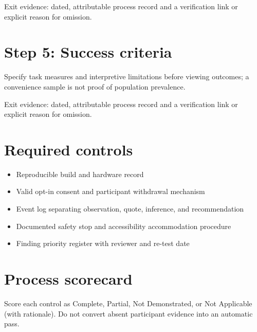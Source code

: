 \documentclass[11pt]{article}
\begin{document}
Exit evidence: dated, attributable process record and a verification link or explicit reason for omission.


\section{Step 5: Success criteria}
Specify task measures and interpretive limitations before viewing outcomes; a convenience sample is not proof of population prevalence.

Exit evidence: dated, attributable process record and a verification link or explicit reason for omission.


\section{Required controls}
\begin{itemize}
\item Reproducible build and hardware record
\item Valid opt-in consent and participant withdrawal mechanism
\item Event log separating observation, quote, inference, and recommendation
\item Documented safety stop and accessibility accommodation procedure
\item Finding priority register with reviewer and re-test date
\end{itemize}

\section{Process scorecard}
Score each control as Complete, Partial, Not Demonstrated, or Not Applicable (with rationale). Do not convert absent participant evidence into an automatic pass.
\end{document}
